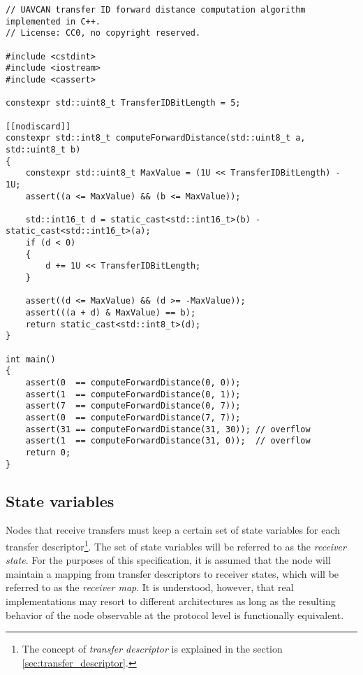 \begin{minipage}{0.9\textwidth}  %
\begin{verbatim}
// UAVCAN transfer ID forward distance computation algorithm implemented in C++.
// License: CC0, no copyright reserved.

#include <cstdint>
#include <iostream>
#include <cassert>

constexpr std::uint8_t TransferIDBitLength = 5;

[[nodiscard]]
constexpr std::int8_t computeForwardDistance(std::uint8_t a, std::uint8_t b)
{
    constexpr std::uint8_t MaxValue = (1U << TransferIDBitLength) - 1U;
    assert((a <= MaxValue) && (b <= MaxValue));

    std::int16_t d = static_cast<std::int16_t>(b) - static_cast<std::int16_t>(a);
    if (d < 0)
    {
        d += 1U << TransferIDBitLength;
    }

    assert((d <= MaxValue) && (d >= -MaxValue));
    assert(((a + d) & MaxValue) == b);
    return static_cast<std::int8_t>(d);
}

int main()
{
    assert(0  == computeForwardDistance(0, 0));
    assert(1  == computeForwardDistance(0, 1));
    assert(7  == computeForwardDistance(0, 7));
    assert(0  == computeForwardDistance(7, 7));
    assert(31 == computeForwardDistance(31, 30)); // overflow
    assert(1  == computeForwardDistance(31, 0));  // overflow
    return 0;
}
\end{verbatim}
\end{minipage}

\subsection{State variables}

Nodes that receive transfers must keep a certain set of state variables for each
transfer descriptor\footnote{The concept of \emph{transfer descriptor} is explained
in the section \ref{sec:transfer_descriptor}.}.
The set of state variables will be referred to as the \emph{receiver state}.
For the purposes of this specification, it is assumed that the node will maintain a
mapping from transfer descriptors to receiver states, which will be referred to as the \emph{receiver map}.
It is understood, however, that real implementations may resort to different architectures as
long as the resulting behavior of the node observable at the protocol level is functionally equivalent.

